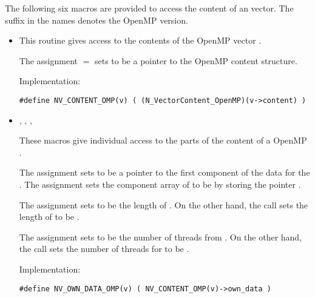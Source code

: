 The following six macros are provided to access the content of an {\nvecopenmp}
vector. The suffix  in the names denotes the OpenMP version.
\begin{itemize}

\item {}                             
    
  This routine gives access to the contents of the OpenMP
  vector .
  
  The assignment  $=$  sets           
   to be a pointer to the OpenMP  content  
  structure.                                             
                                                            
  Implementation: 
  
  \verb|#define NV_CONTENT_OMP(v) ( (N_VectorContent_OpenMP)(v->content) )|
  
\item {}, , , 


  These macros give individual access to the parts of    
  the content of a OpenMP .                        
                                                               
  The assignment  sets  to be     
  a pointer to the first component of the data for the  . 
  The assignment  sets the component array of  to     
  be  by storing the pointer .                   
  
  The assignment  sets  to be     
  the length of . On the other hand, the call  
  sets the length of  to be .
                                                            
  The assignment  sets  to be     
  the number of threads from . On the other hand, the call  
  sets the number of threads for  to be .
                                                            
  Implementation: 
  
  \verb|#define NV_OWN_DATA_OMP(v) ( NV_CONTENT_OMP(v)->own_data )|


\end{itemize}
